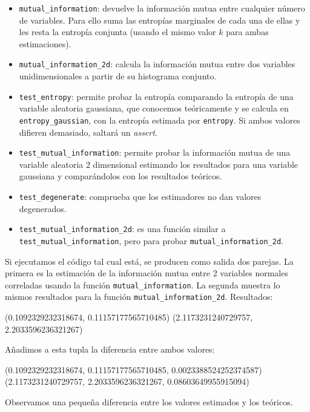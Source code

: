 \documentclass[10pt,a4paper]{article} %
\theoremstyle{definition}
\begin{document}
\begin{itemize}
\item \texttt{mutual\_information}: devuelve la información mutua entre cualquier número de variables. Para ello suma las entropías marginales de cada una de ellas y les resta la entropía conjunta (usando el mismo valor $k$ para ambas estimaciones). %

\item \texttt{mutual\_information\_2d}: calcula la información mutua entre dos variables unidimensionales a partir de su histograma conjunto. 

\item \texttt{test\_entropy}: permite probar la entropía comparando la entropía de una variable aleatoria gaussiana, que conocemos teóricamente y se calcula en \texttt{entropy\_gaussian}, con la entropía estimada por \texttt{entropy}. Si ambos valores difieren demasiado, saltará un \textit{assert}.

\item \texttt{test\_mutual\_information}: permite probar la información mutua de una variable aleatoria 2 dimensional estimando los resultados para una variable gaussiana y comparándolos con los resultados teóricos.

\item \texttt{test\_degenerate}: comprueba que los estimadores no dan valores degenerados.

\item \texttt{test\_mutual\_information\_2d}: es una función similar a \texttt{test\_mutual\_information}, pero para probar \texttt{mutual\_information\_2d}.
\end{itemize} 

Si ejecutamos el código tal cual está, se producen como salida dos parejas. La primera es la estimación de la información mutua entre 2 variables normales correladas usando la función \texttt{mutual\_information}. La segunda muestra lo mismos resultados para la función \texttt{mutual\_information\_2d}.
Resultados:

(0.1092329232318674, 0.11157177565710485)
(2.1173231240729757, 2.2033596236321267)

Añadimos a esta tupla la diferencia entre ambos valores:

(0.1092329232318674, 0.11157177565710485, 0.0023388524252374587)
(2.1173231240729757, 2.2033596236321267, 0.08603649955915094)

Observamos una pequeña diferencia entre los valores estimados y los teóricos.
\end{document}
